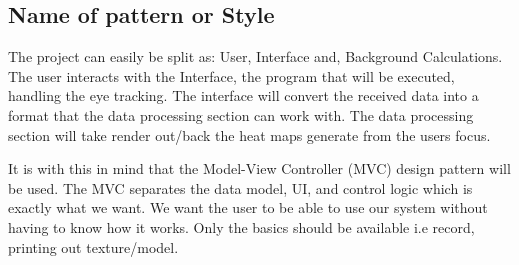 
\subsection{Name of pattern or Style} 
\begin{flushleft}
The project can easily be split as: User, Interface and, Background Calculations. The user interacts with the Interface, the program that will be executed, handling the eye tracking. The interface will convert the received data into a format that the data processing section can work with. The data processing section will take render out/back the heat maps generate from the users focus.

It is with this in mind that the Model-View Controller (MVC) design pattern will be used.
The MVC separates the data model, UI, and control logic which is exactly what we want. We want the user to be able to use our system without having to know how it works. Only the basics should be available i.e record, printing out texture/model.
\end{flushleft}






